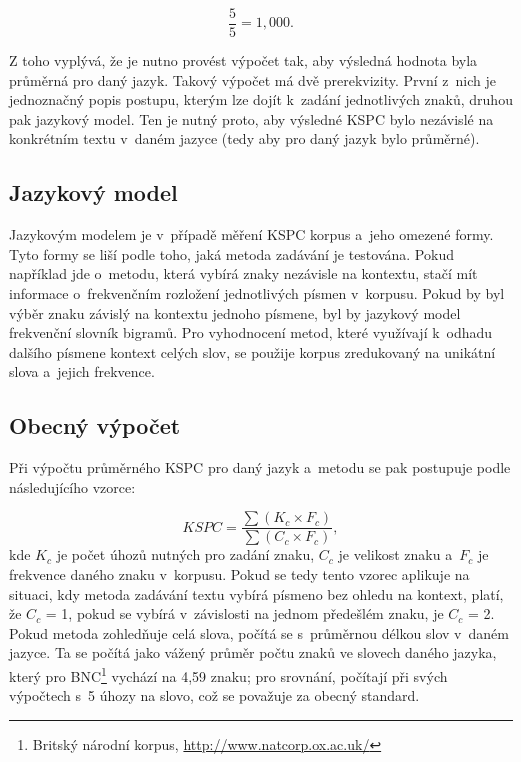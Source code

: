 \documentclass[a4paper,11pt,openany]{book} %
\begin{document}
\[
	\frac{5}{5} = 1,000.
\]

Z toho vyplývá, že je nutno provést výpočet tak, aby výsledná hodnota byla průměrná pro daný jazyk. Takový výpočet má dvě prerekvizity. První z~nich je jednoznačný popis postupu, kterým lze dojít k~zadání jednotlivých znaků, druhou pak jazykový model. Ten je nutný proto, aby výsledné KSPC bylo nezávislé na konkrétním textu v~daném jazyce (tedy aby pro daný jazyk bylo průměrné). \parencite[196]{mackenzie2002kspc}

\subsection{Jazykový model}

Jazykovým modelem je v~případě měření KSPC korpus a~jeho omezené formy. Tyto formy se liší podle toho, jaká metoda zadávání je testována. Pokud například jde o~metodu, která vybírá znaky nezávisle na kontextu, stačí mít informace o~frekvenčním rozložení jednotlivých písmen v~korpusu. Pokud by byl výběr znaku závislý na kontextu jednoho písmene, byl by jazykový model frekvenční slovník bigramů. Pro vyhodnocení metod, které využívají k~odhadu dalšího písmene kontext celých slov, se použije korpus zredukovaný na unikátní slova a~jejich frekvence.  \parencite[197]{mackenzie2002kspc} %

\subsection{Obecný výpočet}

Při výpočtu průměrného KSPC pro daný jazyk a~metodu se pak postupuje podle následujícího vzorce:

\[
	KSPC = \frac{\sum{ (K_c \times F_c) }}{\sum{ (C_c \times F_c) }},
\]
kde $K_c$ je počet úhozů nutných pro zadání znaku, $C_c$ je velikost znaku a~$F_c$ je frekvence daného znaku v~korpusu. Pokud se tedy tento vzorec aplikuje na situaci, kdy metoda zadávání textu vybírá písmeno bez ohledu na kontext, platí, že $C_c$ = 1, pokud se vybírá v~závislosti na jednom předešlém znaku, je $C_c$ = 2. Pokud metoda zohledňuje celá slova, počítá se s~průměrnou délkou slov v~daném jazyce. Ta se počítá jako vážený průměr počtu znaků ve slovech daného jazyka, který pro BNC\footnote{Britský národní korpus, \url{http://www.natcorp.ox.ac.uk/}} vychází na 4,59 znaku; pro srovnání, \textcite[2]{arif2009analysis} počítají při svých výpočtech s~5 úhozy na slovo, což se považuje za obecný standard. \parencite[3]{tarvainen2010beginner} %
\end{document}
